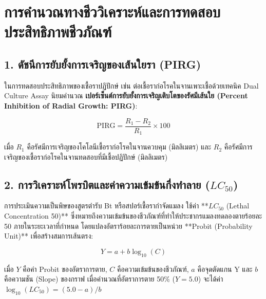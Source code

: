 \section{การคำนวณทางชีววิเคราะห์และการทดสอบประสิทธิภาพชีวภัณฑ์}

\subsection{1. ดัชนีการยับยั้งการเจริญของเส้นใยรา (PIRG)}
ในการทดสอบประสิทธิภาพของเชื้อราปฏิปักษ์ เช่น  ต่อเชื้อราก่อโรคในจานเพาะเชื้อด้วยเทคนิค Dual Culture Assay นิยมคำนวณ \textbf{เปอร์เซ็นต์การยับยั้งการเจริญเติบโตของรัศมีเส้นใย (Percent Inhibition of Radial Growth: PIRG)}:

\begin{equation}
\text{PIRG} = \frac{R_1 - R_2}{R_1} \times 100
\end{equation}

เมื่อ $R_1$ คือรัศมีการเจริญของโคโลนีเชื้อราก่อโรคในจานควบคุม (มิลลิเมตร) และ $R_2$ คือรัศมีการเจริญของเชื้อราก่อโรคในจานทดสอบที่มีเชื้อปฏิปักษ์ (มิลลิเมตร)

\subsection{2. การวิเคราะห์โพรบิตและค่าความเข้มข้นกึ่งทำลาย (\texorpdfstring{$LC_{50}$}{LC50})}
การประเมินความเป็นพิษของสูตรตำรับ Bt หรือสปอร์เชื้อรากำจัดแมลง ใช้ค่า **$LC_{50}$ (Lethal Concentration 50)** ซึ่งหมายถึงความเข้มข้นของชีวภัณฑ์ที่ทำให้ประชากรแมลงทดลองตายร้อยละ 50 ภายในระยะเวลาที่กำหนด โดยแปลงอัตราร้อยละการตายเป็นหน่วย **Probit (Probability Unit)** เพื่อสร้างสมการเส้นตรง:

\begin{equation}
Y = a + b \log_{10}(C)
\end{equation}

เมื่อ $Y$ คือค่า Probit ของอัตราการตาย, $C$ คือความเข้มข้นของชีวภัณฑ์, $a$ คือจุดตัดแกน Y และ $b$ คือความชัน (Slope) ของกราฟ เมื่อคำนวณที่อัตราการตาย 50\% ($Y = 5.0$) จะได้ค่า $\log_{10}(LC_{50}) = (5.0 - a)/b$

